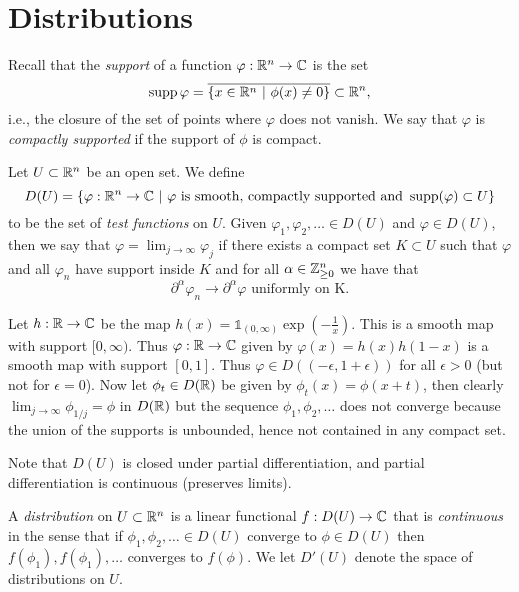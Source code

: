 \documentclass[twoside, a4paper, 10pt]{amsart}
\begin{document}
\section{Distributions}

Recall that the \textit{support} of a function $\varphi:\mathbb{R}^n \to \mathbb{C}$ is the set $$\operatorname{supp} \varphi = \overline{\{x \in \mathbb{R}^n ~|~ \phi(x) \neq 0 \}} \subset \mathbb{R}^n,$$ i.e., the closure of the set of points where $\varphi$ does not vanish. We say that $\varphi$ is \textit{compactly supported} if the support of $\phi$ is compact.

\begin{mydef} Let $U \subset \mathbb{R}^n$ be an open set. We define $$D(U) = \{ \varphi :\mathbb{R}^n \to \mathbb{C} ~|~ \varphi \text{ is smooth, compactly supported and } \operatorname{supp}(\varphi) \subset U  \}$$ to be the set of \textit{test functions} on $U$. Given $\varphi_1,\varphi_2, \ldots \in D(U)$ and $\varphi \in D(U)$, then we say that $\varphi = \lim_{j \to \infty} \varphi_j$ if there exists a compact set $K \subset U$ such that $\varphi$ and all $\varphi_n$ have support inside $K$ and for all $\alpha \in \mathbb{Z}_{\geq 0}^n$ we have that $$\partial^{\alpha} \varphi_n \to \partial^{\alpha} \varphi \text{ uniformly on K.}$$ 

\end{mydef}

	\begin{eg} Let $h:\mathbb{R} \to \mathbb{C}$ be the map $h(x) = \mathds{1}_{(0,\infty)} \exp(-\frac{1}{x})$. This is a smooth map with support $[0, \infty)$. Thus $\varphi:\mathbb{R} \to \mathbb{C}$ given by $\varphi(x) = h(x)h(1-x)$ is a smooth map with support $[0,1]$. Thus $\varphi \in D((-\epsilon, 1 + \epsilon))$ for all $\epsilon >0$ (but not for $\epsilon = 0$). Now let $\phi_t \in D(\mathbb{R})$ be given by $\phi_t(x) = \phi(x+t)$, then clearly $\lim_{j \to \infty} \phi_{1/j} = \phi$ in $D(\mathbb{R})$ but the sequence $\phi_1,\phi_2,\ldots$ does not converge because the union of the supports is unbounded, hence not contained in any compact set.
\end{eg}

Note that $D(U)$ is closed under partial differentiation, and partial differentiation is continuous (preserves limits).

\begin{mydef} A \textit{distribution} on $U \subset \mathbb{R}^n$ is a linear functional $f:D(U) \to \mathbb{C}$ that is \textit{continuous} in the sense that if $\phi_1, \phi_2,\ldots \in D(U)$ converge to $\phi \in D(U)$ then $f(\phi_1), f(\phi_1), \ldots$ converges to $f(\phi)$. We let $D'(U)$ denote the space of distributions on $U$. 

\end{mydef}
\end{document}
